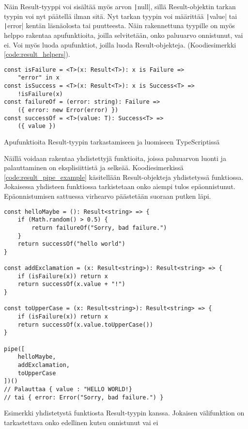 Näin Result-tyyppi voi sisältää myös arvon \texttt|null|, sillä Result-objektin tarkan tyypin voi nyt päätellä ilman sitä. Nyt tarkan tyypin voi määrittää \texttt|value| tai \texttt|error| kentän läsnäolosta tai puutteesta. Näin rakennettuna tyypille on myös helppo rakentaa apufunktioita, joilla selvitetään, onko paluuarvo onnistunut, vai ei. Voi myös luoda apufunktiot, joilla luoda Result-objekteja. (Koodiesimerkki \ref{code:result_helpers}).

\begin{code}
    \begin{verbatim}
const isFailure = <T>(x: Result<T>): x is Failure => 
    "error" in x
const isSuccess = <T>(x: Result<T>): x is Success<T> => 
    !isFailure(x)
const failureOf = (error: string): Failure => 
    ({ error: new Error(error) })
const successOf = <T>(value: T): Success<T> => 
    ({ value })
    \end{verbatim}
    \caption{Apufunktioita Result-tyypin tarkastamiseen ja luomiseen TypeScriptissä}
    \label{code:result_helpers}
\end{code}

Näillä voidaan rakentaa yhdistettyjä funktioita, joissa paluuarvon luonti ja palauttaminen on eksplisiittistä ja selkeää. Koodiesimerkissä \ref{code:result_pipe_example} käsitellään Result-objekteja yhdistetyssä funktiossa. Jokaisessa yhdisteen funktiossa tarkistetaan onko aiempi tulos epäonnistunut. Epäonnistumisen sattuessa virhearvo päästetään suoraan putken läpi.

\begin{code}
    \begin{verbatim}
const helloMaybe = (): Result<string> => {
    if (Math.random() > 0.5) {
        return failureOf("Sorry, bad failure.")
    }
    return successOf("hello world")
}

const addExclamation = (x: Result<string>): Result<string> => {
    if (isFailure(x)) return x
    return successOf(x.value + "!")
}

const toUpperCase = (x: Result<string>): Result<string> => {
    if (isFailure(x)) return x
    return successOf(x.value.toUpperCase())
}

pipe([
    helloMaybe,
    addExclamation,
    toUpperCase
])()
// Palauttaa { value : "HELLO WORLD!}
// tai { error: Error("Sorry, bad failure.") }
    \end{verbatim}
    \caption{Esimerkki yhdistetystä funktiosta Result-tyypin kanssa. Jokaisen välifunktion on tarkastettava onko edellinen kutsu onnistunut vai ei}
    \label{code:result_pipe_example}
\end{code}

